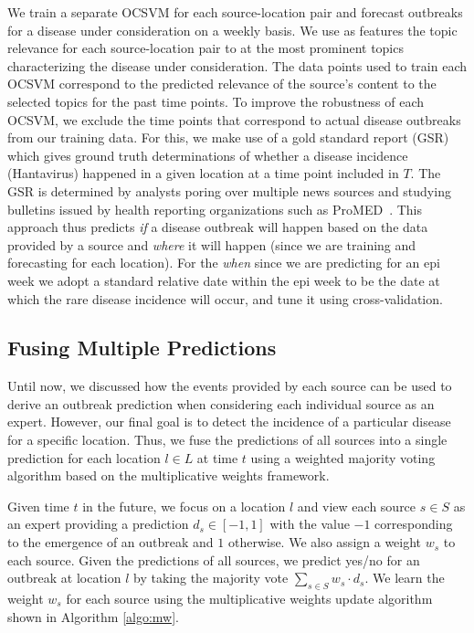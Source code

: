 \documentclass[conference]{IEEEtran}
\begin{document}
We train a separate OCSVM for each source-location pair and forecast outbreaks for a disease under consideration on a weekly basis. We use as features the topic relevance for each source-location pair to at the most prominent topics characterizing the disease under consideration. The data points used to train each OCSVM correspond to the predicted relevance of the source's content to the selected topics for the past time points. To improve the robustness of each OCSVM, we exclude the time points that correspond to actual disease outbreaks from our training data. For this, we make use of a gold standard report (GSR) which gives ground truth determinations of whether a disease incidence (Hantavirus) happened in a given location at a time point included in $T$. The GSR is determined by analysts poring over multiple news sources and studying bulletins issued by health reporting organizations such as ProMED~\cite{probmed}.  This approach thus predicts  {\em if} a disease outbreak will happen based on the data provided by a source and {\em where} it will happen (since we are training and forecasting for each location). For the {\em when} since we are predicting for an epi week we adopt a standard relative date within the epi week to be the date at which the rare disease incidence will occur, and tune it using cross-validation. 

\subsection{Fusing Multiple Predictions}
\label{sec:integration}
Until now, we discussed how the events provided by each source can be used to derive an outbreak prediction when considering each individual source as an expert. However, our final goal is to detect the incidence of a particular disease for a specific location. Thus, we fuse the predictions of all sources into a single prediction for each location $l \in L$ at time $t$ using a weighted majority voting algorithm based on the multiplicative weights framework\cite{arora:2012}.

Given time $t$ in the future, we focus on a location $l$ and view each source $s \in S$ as an expert providing a prediction $d_s \in [-1,1]$ with the value $-1$ corresponding to the emergence of an outbreak and $1$ otherwise. We also assign a weight $w_s$ to each source. Given the predictions of all sources, we predict yes/no for an outbreak at location $l$ by taking the majority vote $\sum_{s \in S} w_s \cdot d_s$.  We learn the weight $w_s$ for each source using the multiplicative weights update algorithm shown in Algorithm \ref{algo:mw}.
\end{document}
